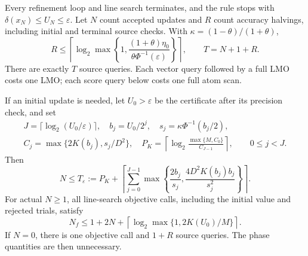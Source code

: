 \begin{theorem}\label{nloracle:main}
Every refinement loop and line search terminates, and the rule stops
with $\delta(x_N)\le U_N\le\varepsilon$.
Let $N$ count accepted updates and $R$ count accuracy halvings, including
initial and terminal source checks. With $\kappa=(1-\theta)/(1+\theta)$,
\begin{equation}\label{nloracle:refinement}
 R\le\left\lceil\log_2\max\left\{1,
 \frac{(1+\theta)\eta_0}{\theta\Phi^{-1}(\varepsilon)}\right\}\right\rceil,
 \qquad T=N+1+R.
\end{equation}
There are exactly $T$ source queries. Each vector query followed by a
full LMO costs one LMO; each score query below costs one full atom scan.

If an initial update is needed, let $U_0>\varepsilon$ be the certificate
after its precision check, and set
\[
 \begin{gathered}
 J=\lceil\log_2(U_0/\varepsilon)\rceil,\quad b_j=U_0/2^j,\quad
 s_j=\kappa\Phi^{-1}(b_j/2),\\
 C_j=\max\{2K(b_j),s_j/D^2\},\quad
 P_K=\left\lceil\log_2\frac{\max\{M,C_0\}}{C_{J-1}}\right\rceil,
 \qquad 0\le j<J.
 \end{gathered}
\]
Then
\begin{equation}\label{nloracle:work}
 N\le T_\varepsilon:=P_K+
 \left\lceil\sum_{j=0}^{J-1}
 \max\left\{\frac{2b_j}{s_j},\frac{4D^2K(b_j)b_j}{s_j^2}\right\}\right\rceil.
\end{equation}
For actual $N\ge1$, all line-search objective calls, including the
initial value and rejected trials, satisfy
\begin{equation}\label{nloracle:functions}
 N_f\le1+2N+
 \left\lceil\log_2\max\{1,2K(U_0)/M\}\right\rceil.
\end{equation}
If $N=0$, there is one objective call and $1+R$ source queries.
The phase quantities are then unnecessary.
\end{theorem}

